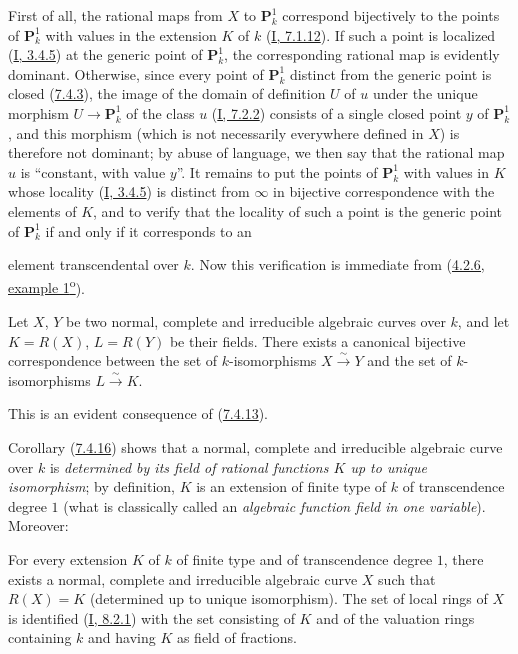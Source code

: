 First of all, the rational maps from $X$ to $\mathbf{P}_k^1$
correspond bijectively to the points of $\mathbf{P}_k^1$ with values in
the extension $K$ of $k$ (\hyperref[I.7.1.12]{I, 7.1.12}). If such a point
is localized (\hyperref[I.3.4.5]{I, 3.4.5}) at the generic point of
$\mathbf{P}_k^1$, the corresponding rational map is evidently
dominant. Otherwise, since every point of $\mathbf{P}_k^1$
distinct from the generic point is closed (\hyperref[II.7.4.3]{7.4.3}),
the image of the domain of definition $U$ of $u$ under the unique morphism
$U\to\mathbf{P}_k^1$ of the class $u$ (\hyperref[I.7.2.2]{I, 7.2.2})
consists of a single closed point $y$ of $\mathbf{P}_k^1$, and this morphism
(which is not necessarily everywhere defined in $X$) is therefore not dominant;
by abuse of language, we then say that the rational map $u$ is
``constant, with value $y$''. It remains to put the points of
$\mathbf{P}_k^1$ with values in $K$ whose locality
(\hyperref[I.3.4.5]{I, 3.4.5}) is distinct from $\infty$ in bijective
correspondence with the elements of $K$, and to verify that the locality of
such a point is the generic point of $\mathbf{P}_k^1$ if and only if it
corresponds to an

element transcendental over $k$. Now this verification is immediate from
(\hyperref[II.4.2.6]{4.2.6, example 1\textsuperscript{o}}).

\begin{corollary}[7.4.16]
\label{II.7.4.16}
Let $X$, $Y$ be two normal, complete and irreducible algebraic curves over
$k$, and let $K=R(X)$, $L=R(Y)$ be their fields. There exists a
canonical bijective correspondence between the set of $k$-isomorphisms
$X\xrightarrow{\sim}Y$ and the set of $k$-isomorphisms
$L\xrightarrow{\sim}K$.
\end{corollary}

This is an evident consequence of (\hyperref[II.7.4.13]{7.4.13}).

\begin{env}[7.4.17]
\label{II.7.4.17}
Corollary (\hyperref[II.7.4.16]{7.4.16}) shows that a normal, complete
and irreducible algebraic curve over $k$ is \emph{determined by its field
of rational functions $K$ up to unique isomorphism}; by definition,
$K$ is an extension of finite type of $k$ of transcendence degree $1$ (what
is classically called an \emph{algebraic function field in one
variable}). Moreover:
\end{env}

\begin{proposition}[7.4.18]
\label{II.7.4.18}
For every extension $K$ of $k$ of finite type and of transcendence degree
$1$, there exists a normal, complete and irreducible algebraic curve $X$
such that $R(X)=K$ (determined up to unique isomorphism). The set of
local rings of $X$ is identified (\hyperref[I.8.2.1]{I, 8.2.1}) with
the set consisting of $K$ and of the valuation rings containing $k$ and having
$K$ as field of fractions.
\end{proposition}

